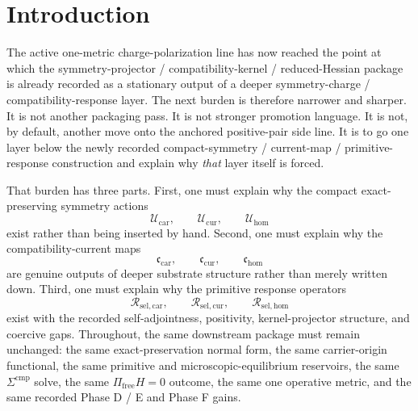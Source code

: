 \documentclass[11pt]{article}
\newcommand{\TensorSymAct}{\mathscr U_{\mathrm{car}}}
\newcommand{\CurSymAct}{\mathscr U_{\mathrm{cur}}}
\newcommand{\HomSymAct}{\mathscr U_{\mathrm{hom}}}
\newcommand{\TensorCurrent}{\mathfrak c_{\mathrm{car}}}
\newcommand{\CurCurrent}{\mathfrak c_{\mathrm{cur}}}
\newcommand{\HomCurrent}{\mathfrak c_{\mathrm{hom}}}
\newcommand{\TensorResp}{\mathcal R_{\mathrm{sel,car}}}
\newcommand{\CurResp}{\mathcal R_{\mathrm{sel,cur}}}
\newcommand{\HomResp}{\mathcal R_{\mathrm{sel,hom}}}
\begin{document}
\begin{abstract}
Therefore the previously recorded symmetry-charge / compatibility-response functional is recovered without change. By the immediately preceding note, that exact same functional again reduces to the same Hessian-layer functional, the same microphysical exact-preservation functional, the same exact-preservation normal form, the same carrier-origin functional, the same primitive and microscopic-equilibrium reservoirs, and the same one-metric charge-polarization completion package.

The scope remains disciplined. This note does not claim a final ultraviolet completion or a unique ultimate substrate action. Its exact positive claim is narrower: the compact symmetry actions, compatibility-current maps, and primitive response operators of the previous note are themselves no longer primitive at current scope, but arise from a still more primitive charge-generator / continuity-hessian substrate layer while preserving the same downstream package.
\end{abstract}

\section{Introduction}

The active one-metric charge-polarization line has now reached the point at which the symmetry-projector / compatibility-kernel / reduced-Hessian package is already recorded as a stationary output of a deeper symmetry-charge / compatibility-response layer. The next burden is therefore narrower and sharper. It is not another packaging pass. It is not stronger promotion language. It is not, by default, another move onto the anchored positive-pair side line. It is to go one layer below the newly recorded compact-symmetry / current-map / primitive-response construction and explain why \emph{that} layer itself is forced.

That burden has three parts. First, one must explain why the compact exact-preserving symmetry actions
\[
\TensorSymAct,\qquad
\CurSymAct,\qquad
\HomSymAct
\]
exist rather than being inserted by hand. Second, one must explain why the compatibility-current maps
\[
\TensorCurrent,\qquad
\CurCurrent,\qquad
\HomCurrent
\]
are genuine outputs of deeper substrate structure rather than merely written down. Third, one must explain why the primitive response operators
\[
\TensorResp,\qquad
\CurResp,\qquad
\HomResp
\]
exist with the recorded self-adjointness, positivity, kernel-projector structure, and coercive gaps. Throughout, the same downstream package must remain unchanged: the same exact-preservation normal form, the same carrier-origin functional, the same primitive and microscopic-equilibrium reservoirs, the same \(\Sigma^{\mathrm{cmp}}\) solve, the same \(\Pi_{\mathrm{free}}H=0\) outcome, the same one operative metric, and the same recorded Phase D / E and Phase F gains.
\end{document}
